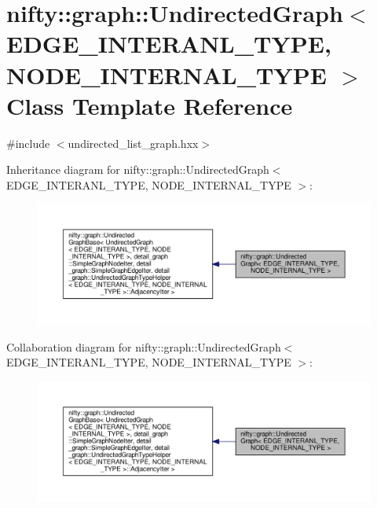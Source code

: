 \hypertarget{classnifty_1_1graph_1_1UndirectedGraph}{}\section{nifty\+:\+:graph\+:\+:Undirected\+Graph$<$ E\+D\+G\+E\+\_\+\+I\+N\+T\+E\+R\+A\+N\+L\+\_\+\+T\+Y\+PE, N\+O\+D\+E\+\_\+\+I\+N\+T\+E\+R\+N\+A\+L\+\_\+\+T\+Y\+PE $>$ Class Template Reference}
\label{classnifty_1_1graph_1_1UndirectedGraph}


{\ttfamily \#include $<$undirected\+\_\+list\+\_\+graph.\+hxx$>$}



Inheritance diagram for nifty\+:\+:graph\+:\+:Undirected\+Graph$<$ E\+D\+G\+E\+\_\+\+I\+N\+T\+E\+R\+A\+N\+L\+\_\+\+T\+Y\+PE, N\+O\+D\+E\+\_\+\+I\+N\+T\+E\+R\+N\+A\+L\+\_\+\+T\+Y\+PE $>$\+:
\nopagebreak
\begin{figure}[H]
\begin{center}
\leavevmode
\includegraphics[width=350pt]{classnifty_1_1graph_1_1UndirectedGraph__inherit__graph}
\end{center}
\end{figure}


Collaboration diagram for nifty\+:\+:graph\+:\+:Undirected\+Graph$<$ E\+D\+G\+E\+\_\+\+I\+N\+T\+E\+R\+A\+N\+L\+\_\+\+T\+Y\+PE, N\+O\+D\+E\+\_\+\+I\+N\+T\+E\+R\+N\+A\+L\+\_\+\+T\+Y\+PE $>$\+:
\nopagebreak
\begin{figure}[H]
\begin{center}
\leavevmode
\includegraphics[width=350pt]{classnifty_1_1graph_1_1UndirectedGraph__coll__graph}
\end{center}
\end{figure}
